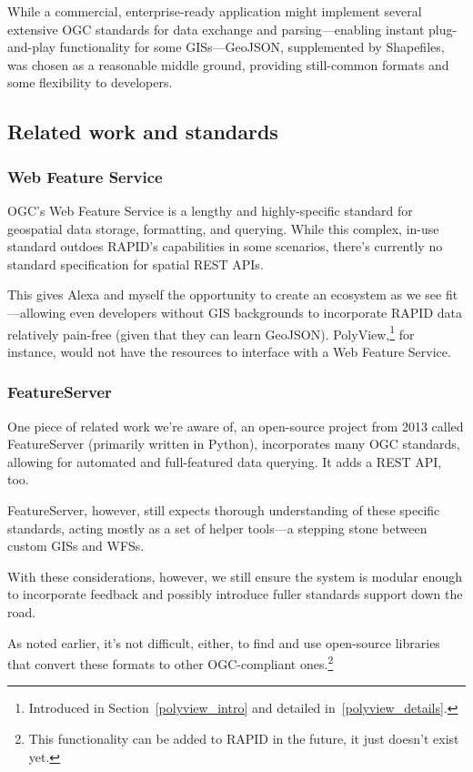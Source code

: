 While a commercial, enterprise-ready application might implement several extensive OGC standards for data exchange and parsing---enabling instant plug-and-play functionality for some GISs---GeoJSON, supplemented by Shapefiles, was chosen as a reasonable middle ground, providing still-common formats and some flexibility to developers.

\subsection{Related work and standards}
\subsubsection{Web Feature Service}
OGC's Web Feature Service is a lengthy and highly-specific standard for geospatial data storage, formatting, and querying. While this complex, in-use standard outdoes RAPID's capabilities in some scenarios, there's currently no standard specification for spatial REST APIs.

This gives Alexa and myself the opportunity to create an ecosystem as we see fit---allowing even developers without GIS backgrounds to incorporate RAPID data relatively pain-free (given that they can learn GeoJSON). PolyView,\footnote{Introduced in Section~\ref{polyview_intro} and detailed in~\ref{polyview_details}.} for instance, would not have the resources to interface with a Web Feature Service.

\subsubsection{FeatureServer}

One piece of related work we're aware of, an open-source project from 2013 called FeatureServer (primarily written in Python), incorporates many OGC standards, allowing for automated and full-featured data querying. It adds a REST API, too.

FeatureServer, however, still expects thorough understanding of these specific standards, acting mostly as a set of helper tools---a stepping stone between custom GISs and WFSs.


With these considerations, however, we still ensure the system is modular enough to incorporate feedback and possibly introduce fuller standards support down the road.


As noted earlier, it's not difficult, either, to find and use open-source libraries that convert these formats to other OGC-compliant ones.\footnote{This functionality can be added to RAPID in the future, it just doesn't exist yet.}


